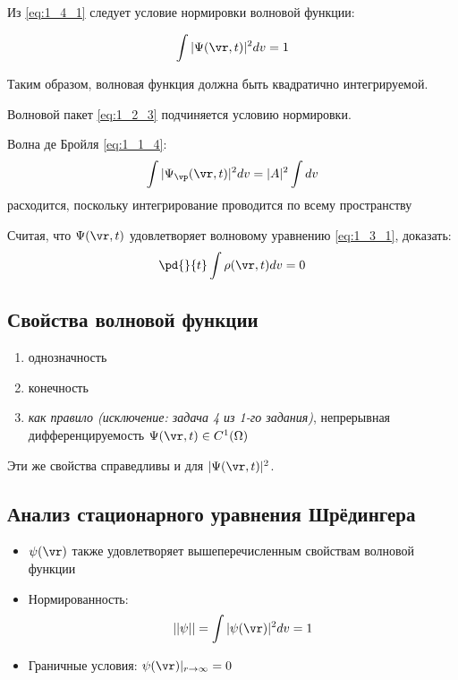 Из \eqref{eq:1_4_1} следует условие нормировки волновой функции:

\begin{equation}
\label{eq:1_4_3}
\int |\Psi(\vr,t)|^2 dv = 1
\end{equation}

Таким образом, волновая функция должна быть квадратично интегрируемой.

\begin{exmpl}
Волновой пакет \eqref{eq:1_2_3} подчиняется условию нормировки.
\end{exmpl}

\begin{exmpl}
Волна де Бройля \eqref{eq:1_1_4}:
$$\int |\Psi_{\vp}(\vr,t)|^2 dv = |A|^2 \int dv$$
расходится, поскольку интегрирование проводится по всему пространству
\end{exmpl}


\begin{excr}
Считая, что $\Psi(\vr,t)$ удовлетворяет волновому уравнению \eqref{eq:1_3_1}, доказать:
$$\pd{}{t} \int \rho(\vr,t) dv = 0$$
\end{excr}

\subsection*{Свойства волновой функции}

\begin{enumerate}
\item однозначность
\item конечность
\item \textit{как правило (исключение: задача 4 из 1-го задания)}, непрерывная дифференцируемость $\Psi(\vr,t) \in C^1(\Omega)$
\end{enumerate}

Эти же свойства справедливы и для $|\Psi(\vr,t)|^2$.

\subsection*{Анализ стационарного уравнения Шрёдингера}

\begin{itemize}
\item $\psi(\vr)$ также удовлетворяет вышеперечисленным свойствам волновой функции
\item Нормированность: 
\begin{equation}
\label{eq:1_4_4}
||\psi|| = \int |\psi(\vr)|^2 dv = 1
\end{equation}
\item Граничные условия: $\psi(\vr)|_{r \to \infty} = 0$
\end{itemize}

